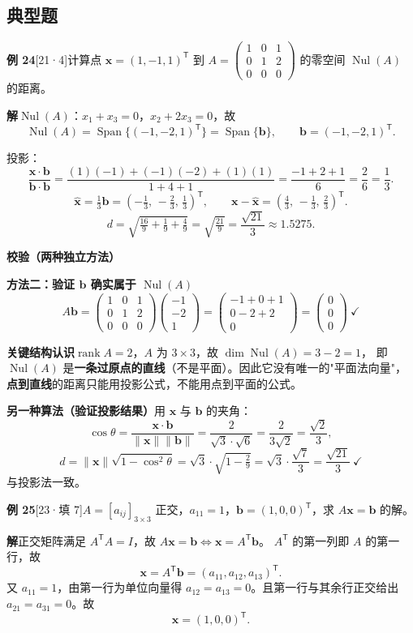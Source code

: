 \documentclass[10pt]{ctexart}
\newcommand{\rank}{\operatorname{rank}}
\newcommand{\Nul}{\operatorname{Nul}}
\newcommand{\Span}{\operatorname{Span}}
\newcommand{\TT}{^{\mathsf T}}
\newcommand{\bv}[1]{\begin{pmatrix}#1\end{pmatrix}}
\newcommand{\y}[1]{\textcolor{y21}{[21·#1]}}
\newcommand{\yiii}[1]{\textcolor{y23}{[23·#1]}}
\begin{document}
\subsection{典型题}

\textbf{例 24}\y{4}\quad 计算点 $\mathbf x=(1,-1,1)\TT$ 到 $A=\bv{1&0&1\\0&1&2\\0&0&0}$ 的零空间 $\Nul(A)$ 的距离。

\textbf{解}\quad $\Nul(A)$：$x_1+x_3=0$，$x_2+2x_3=0$，故
\[
\Nul(A)=\Span\{(-1,-2,1)\TT\}=\Span\{\mathbf b\},\qquad \mathbf b=(-1,-2,1)\TT .
\]

投影：
\[
\frac{\mathbf x\cdot\mathbf b}{\mathbf b\cdot\mathbf b}=\frac{(1)(-1)+(-1)(-2)+(1)(1)}{1+4+1}=\frac{-1+2+1}{6}=\frac{2}{6}=\frac13 .
\]
\[
\hat{\mathbf x}=\tfrac13\mathbf b=\left(-\tfrac13,\,-\tfrac23,\,\tfrac13\right)\TT ,
\qquad
\mathbf x-\hat{\mathbf x}=\left(\tfrac43,\,-\tfrac13,\,\tfrac23\right)\TT .
\]
\[
d=\sqrt{\tfrac{16}{9}+\tfrac19+\tfrac49}=\sqrt{\tfrac{21}{9}}=\frac{\sqrt{21}}{3}\approx1.5275 .
\]

\textbf{校验（两种独立方法）}\quad

\textbf{方法二：验证 $\mathbf b$ 确实属于 $\Nul(A)$}\quad
\[
A\mathbf b=\bv{1&0&1\\0&1&2\\0&0&0}\bv{-1\\-2\\1}=\bv{-1+0+1\\0-2+2\\0}=\bv{0\\0\\0}\ \checkmark
\]

\textbf{关键结构认识}\quad $\rank A=2$，$A$ 为 $3\times 3$，故 $\dim\Nul(A)=3-2=1$，
即 $\Nul(A)$ 是\textbf{一条过原点的直线}（不是平面）。因此它没有唯一的"平面法向量"，
\textbf{点到直线}的距离只能用投影公式，不能用点到平面的公式。

\textbf{另一种算法（验证投影结果）}\quad 用 $\mathbf x$ 与 $\mathbf b$ 的夹角：
\[
\cos\theta=\frac{\mathbf x\cdot\mathbf b}{\lVert\mathbf x\rVert\lVert\mathbf b\rVert}
=\frac{2}{\sqrt3\cdot\sqrt6}=\frac{2}{3\sqrt2}=\frac{\sqrt2}{3},
\]
\[
d=\lVert\mathbf x\rVert\sqrt{1-\cos^2\theta}
=\sqrt3\cdot\sqrt{1-\tfrac29}=\sqrt3\cdot\frac{\sqrt7}{3}=\frac{\sqrt{21}}{3}\ \checkmark
\]
与投影法一致。

\medskip
\textbf{例 25}\yiii{填 7}\quad $A=[a_{ij}]_{3\times3}$ 正交，$a_{11}=1$，$\mathbf b=(1,0,0)\TT$，求 $A\mathbf x=\mathbf b$ 的解。

\textbf{解}\quad 正交矩阵满足 $A\TT A=I$，故 $A\mathbf x=\mathbf b\iff\mathbf x=A\TT\mathbf b$。
$A\TT$ 的第一列即 $A$ 的第一行，故
\[
\mathbf x=A\TT\mathbf b=(a_{11},a_{12},a_{13})\TT .
\]
又 $a_{11}=1$，由第一行为单位向量得 $a_{12}=a_{13}=0$。且第一行与其余行正交给出
$a_{21}=a_{31}=0$。故
\[
\mathbf x=(1,0,0)\TT .
\]
\end{document}
